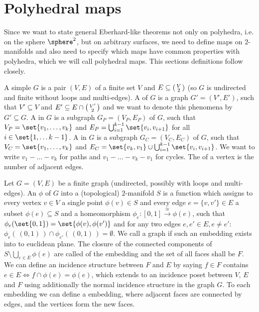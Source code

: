 \section{Polyhedral maps}\label{sec:polymap}

Since we want to state general {\sc Eberhard}-like theorems not only on polyhedra, i.e. on the sphere $\sphere^2$, but on arbitrary surfaces, we need to define maps on $2$-manifolds and also need to specify which maps have common properties with polyhedra, which we will call polyhedral maps. This sections definitions follow \cite{brehm2004polyhedralmaps} closely.

\begin{definition}
  A simple  $G$ is a pair $(V, E)$ of a finite set $V$ and $E \subseteq \begin{psmallmatrix}V\\2\end{psmallmatrix}$ (so $G$ is undirected and finite without loops and multi-edges). A  of $G$ is a graph $G' = (V', E')$, such that $V' \subseteq V$ and $E' \subseteq E \cap  \begin{psmallmatrix}V'\\2\end{psmallmatrix}$ and we want to denote this phenomena by $G' \subseteq G$. A  in $G$ is a subgraph $G_P = (V_P, E_P)$ of $G$, such that $V_P = \set{v_1, \dots, v_k}$ and $E_P = \bigcup_{i = 1}^{k-1}\set{v_i, v_{i+1}}$ for all $i \in \set{1, \dots k - 1}$. A  in $G$ is a subgraph $G_C = (V_C, E_C)$ of $G$, such that $V_C = \set{v_1, \dots, v_k}$ and $E_C = \set{v_k, v_1} \cup \bigcup_{i = 1}^{k-1}\set{v_i, v_{i+1}}$. We want to write $v_1 - \dots - v_k$ for paths and $v_1 - \dots - v_k - v_1$ for cycles. The  of a vertex is the number of adjacent edges.
\end{definition}

\begin{definition} Let $G = (V, E)$ be a finite graph (undirected, possibly with loops and multi-edges). An  $\phi$ of $G$ into a (topological) $2$-manifold $S$ is a function which assigns to every vertex $v \in V$ a single point $\phi(v) \in S$ and every edge $e = \{v, v'\} \in E$ a subset $\phi(e) \subseteq S$ and a homeomorphism $\phi_e : [0, 1] \stackrel{\cong}{\longrightarrow} \phi(e)$, such that $\phi_e(\set{0, 1}) = \set{\phi(v), \phi(v')}$ and for any two edges $e, e' \in E, e \neq e'$: $\phi_e(\,(0,1)\,) \cap \phi_{e'}(\,(0,1)\,) = \emptyset$. We call a graph  if such an embedding exists into to euclidean plane. The closure of the connected components of $S \setminus \bigcup_{e \in E} \phi(e)$ are called  of the embedding and the set of all faces shall be $F$. We can define an incidence structure between $F$ and $E$ by saying $f \in F$ contains $e \in E \iff f \cap \phi(e) = \phi(e)$, which extends to an incidence poset between $V$, $E$ and $F$ using additionally the normal incidence structure in the graph $G$. To each embedding we can define a  embedding, where adjacent faces are connected by edges, and the vertices form the new faces.
\end{definition}

